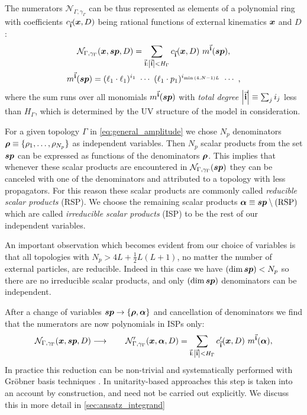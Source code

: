 The numerators $\mathcal{N}_{\Gamma,\gamma_\Gamma}$ can be thus represented as elements of a polynomial ring
with coefficients $c_{\va{i}}(\vb*{x},D)$ being rational functions of external kinematics $\vb*{x}$ and $D$:
\begin{multline}
  \mathcal{N}_{\Gamma,\gamma_\Gamma}(\vb*{x}, \vb*{sp}, D) = \sum_{\va{i} : \abs{\va{i}} < H_{\Gamma}} c_{\va{i}} (\vb*{x},D)~ m^{\va{i}}(\vb*{sp}), \\
  m^{\va{i}}(\vb*{sp}) = (\sp(\ell_1,\ell_1))^{i_1} ~\cdots~ (\sp(\ell_1,p_1))^{i_{\min\qty(4,N-1)L}} ~\cdots~,
\end{multline}
where the sum runs over all monomials $m^{\va{i}}(\vb*{sp})$ with \emph{total degree} $\abs{\va{i}} \equiv \sum_j i_j$ less than
$ H_{\Gamma} $, which is determined by the UV structure of the model in consideration.


For a given topology $\Gamma$ in \cref{eq:general_amplitude} we chose $N_p$ denominators $\vb*{\rho}\equiv\{\rho_1,\ldots,\rho_{N_p}\}$ as
independent variables. Then $N_p$ scalar products from the set $\vb*{sp}$
can be expressed as functions of the denominators $\vb*{\rho}$.
This implies
that whenever these scalar products are encountered in $\mathcal{N}_{\Gamma,\gamma_\Gamma}\qty(\vb*{sp})$ they can be canceled with
one of the denominators and attributed to a topology with less propagators.
For this reason these scalar products are commonly called \emph{reducible scalar products} (RSP).
We choose the remaining scalar products $\vb*{\alpha} \equiv \vb*{sp} \setminus \text{(RSP)}$ which are called
\emph{irreducible scalar products} (ISP) to be the rest of our independent variables.

An important observation which becomes evident from our choice of variables is that all topologies with $N_p> 4 L +\frac{1}{2}L(L+1)$, no matter the number of external particles, are reducible.
Indeed in this case we have $(\dim\vb*{sp}) < N_p$ so there are no irreducible scalar products, and only $(\dim\vb*{sp})$ denominators can be independent.


After a change of variables $\vb*{sp}\to \{\vb*{\rho},\vb*{\alpha}\}$ and cancellation of denominators
we find that the numerators are now polynomials in ISPs only:
\begin{equation}
  \label{eq:rsp_reduction}
  \mathcal{N}_{\Gamma,\gamma_\Gamma}(\vb*{x}, \vb*{sp}, D) \longrightarrow \qquad
    \mathcal{N}^{\prime}_{\Gamma,\gamma_\Gamma}(\vb*{x}, \vb*{\alpha}, D) =
    \sum_{\va{i} : \abs{\va{i}} < H_{\Gamma}} c^{\prime}_{\va{i}} (\vb*{x},D)~ m^{\va{i}}(\vb*{\alpha}),
\end{equation}
In practice this reduction can be non-trivial and systematically performed with Gröbner basis techniques \cite{Zhang:2012ce,Mastrolia:2012wf,Mastrolia:2012an,Mastrolia:2016dhn}.
In unitarity-based approaches this step is taken into an account by construction,
and need not be carried out explicitly. We discuss this in more detail in \cref{sec:ansatz_integrand}

